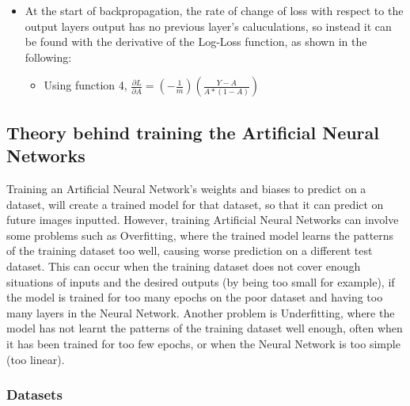 \documentclass[./project-report/src/latex/project-report.tex]{subfiles}
\begin{document}
\begin{itemize}
\begin{itemize}
    \end{itemize}
    \item At the start of backpropagation, the rate of change of loss with respect to the output layers output has no previous layer's caluculations, so instead it can 
          be found with the derivative of the Log-Loss function, as shown in the following:
    \begin{itemize}
        \item Using function 4, $\frac{\partial{L}}{\partial{A}} = (-\frac{1}{m})(\frac{Y-A}{A * (1-A)})$
    \end{itemize}
\end{itemize}

\subsection{Theory behind training the Artificial Neural Networks}

Training an Artificial Neural Network's weights and biases to predict on a dataset, will create a trained model for that dataset, so that it can predict on future 
images inputted. However, training Artificial Neural Networks can involve some problems such as Overfitting, where the trained model learns the patterns of the 
training dataset too well, causing worse prediction on a different test dataset. This can occur when the training dataset does not cover enough situations of inputs 
and the desired outputs (by being too small for example), if the model is trained for too many epochs on the poor dataset and having too many layers in the Neural 
Network. Another problem is Underfitting, where the model has not learnt the patterns of the training dataset well enough, often when it has been trained for too few 
epochs, or when the Neural Network is too simple (too linear).

\subsubsection{Datasets}
\vspace{5mm}
\end{document}
